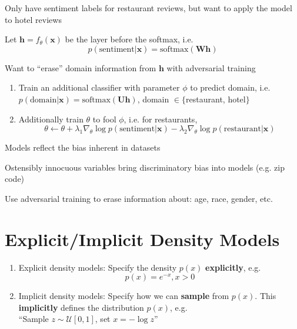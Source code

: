 \documentclass{beamer}
\let\tempone\itemize
\let\temptwo\enditemize
\renewenvironment{itemize}{\tempone\addtolength{\itemsep}{0.5\baselineskip}}{\temptwo}
\newcommand{\xvec}{\mathbf{x}}
\begin{document}
\begin{frame}
\begin{center}
\end{center}
\begin{itemize}
\item Only have sentiment labels for restaurant reviews, but want to apply the model to hotel reviews \pause
\item Let $\mathbf{h} = f_\theta(\xvec)$ be the layer before the softmax, i.e.
\[ p(\text{sentiment} | \xvec) = \text{softmax}(\mathbf{W}\mathbf{h}) \]
\item Want to ``erase'' domain information from $\mathbf{h}$ with adversarial training
\begin{enumerate} \pause
\item Train an additional classifier with parameter $\phi$ to predict domain, i.e.
$p(\text{domain} | \xvec) = \text{softmax}(\mathbf{U}\mathbf{h})$, domain $\in \{$restaurant, hotel$\}$ \pause
\item Additionally train $\theta$ to fool $\phi$, i.e. for restaurants,
\[ \theta \gets \theta + \lambda_1 \nabla_\theta \log p(\text{sentiment} | \xvec) - \lambda_2 \nabla_\theta \log p(\text{restaurant} | \xvec) \]
\end{enumerate}
\end{itemize}
\end{frame}

\begin{frame}
\begin{center}
\end{center}
\begin{itemize}
\item Models reflect the bias inherent in datasets
\item Ostensibly innocuous variables bring discriminatory bias into models (e.g. zip code)
\item Use adversarial training to erase information about: age, race, gender, etc.
\end{itemize}
\end{frame}


\section{Explicit/Implicit Density Models}

\begin{frame}
\begin{center}
\begin{enumerate}
\item Explicit density models: Specify the density $p(x)$ \textbf{explicitly}, e.g.
\[ p(x) = e^{-x}, x > 0 \] \pause
\item Implicit density models: Specify how we can \textbf{sample} from $p(x)$. This \textbf{implicitly} defines the distribution $p(x)$, e.g. \\
\center
``Sample $z \sim \mathcal{U}[0, 1]$, set $x = -\log z$''
\end{enumerate}
\end{center}
\end{frame}
\end{document}
